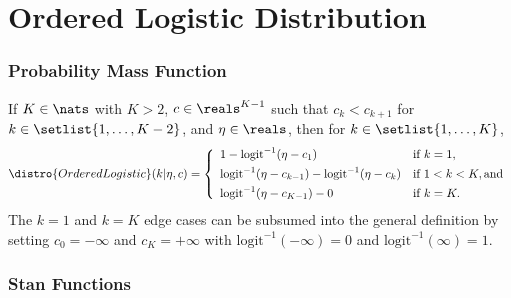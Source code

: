 \begin{description}
%
%
\end{description}
%
\begin{description}
\end{description}



\section{Ordered Logistic Distribution}

\subsubsection{Probability Mass Function}

If $K \in \nats$ with $K > 2$, $c \in \reals^{K-1}$ such that $c_k <
c_{k+1}$ for $k \in \setlist{1,\ldots,K-2}$, and $\eta \in \reals$, then for $k \in
\setlist{1,\ldots,K}$,
\[
\distro{OrderedLogistic}(k|\eta,c)
=
\left\{
\begin{array}{ll}
1 - \mbox{logit}^{-1}(\eta - c_1) & \mbox{if } k = 1,
\\[4pt]
\mbox{logit}^{-1}(\eta - c_{k-1}) - \mbox{logit}^{-1}(\eta -
c_{k})

& \mbox{if } 1 < k < K, \mbox{and}
\\[4pt]
\mbox{logit}^{-1}(\eta - c_{K-1}) - 0
& \mbox{if } k = K.
\end{array}
\right.
\]
%
The $k=1$ and $k=K$ edge cases can be subsumed into the general definition
by setting $c_0 = -\infty$ and $c_K = +\infty$ with
$\mbox{logit}^{-1}(-\infty) = 0$ and $\mbox{logit}^{-1}(\infty) = 1$.



\subsubsection{Stan Functions}

